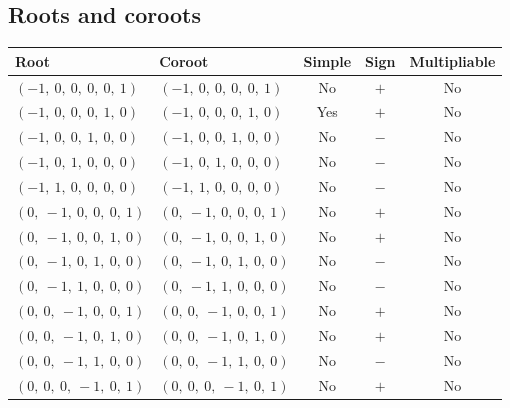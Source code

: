 \documentclass[11pt]{article}
\theoremstyle{definition}
\begin{document}
\subsection{Roots and coroots}
\begin{center}
\begin{tabular}{|l|l|c|c|c|}
    \hline
    \textbf{Root} & \textbf{Coroot} & \textbf{Simple} & \textbf{Sign} & \textbf{Multipliable} \\
    \hline
    $\left( -1, \  0, \  0, \  0, \  0, \  1\right)$ & $\left( -1, \  0, \  0, \  0, \  0, \  1\right)$ & No & $+$ & No \\
    \hline
    $\left( -1, \  0, \  0, \  0, \  1, \  0\right)$ & $\left( -1, \  0, \  0, \  0, \  1, \  0\right)$ & Yes & $+$ & No \\
    \hline
    $\left( -1, \  0, \  0, \  1, \  0, \  0\right)$ & $\left( -1, \  0, \  0, \  1, \  0, \  0\right)$ & No & $-$ & No \\
    \hline
    $\left( -1, \  0, \  1, \  0, \  0, \  0\right)$ & $\left( -1, \  0, \  1, \  0, \  0, \  0\right)$ & No & $-$ & No \\
    \hline
    $\left( -1, \  1, \  0, \  0, \  0, \  0\right)$ & $\left( -1, \  1, \  0, \  0, \  0, \  0\right)$ & No & $-$ & No \\
    \hline
    $\left( 0, \  -1, \  0, \  0, \  0, \  1\right)$ & $\left( 0, \  -1, \  0, \  0, \  0, \  1\right)$ & No & $+$ & No \\
    \hline
    $\left( 0, \  -1, \  0, \  0, \  1, \  0\right)$ & $\left( 0, \  -1, \  0, \  0, \  1, \  0\right)$ & No & $+$ & No \\
    \hline
    $\left( 0, \  -1, \  0, \  1, \  0, \  0\right)$ & $\left( 0, \  -1, \  0, \  1, \  0, \  0\right)$ & No & $-$ & No \\
    \hline
    $\left( 0, \  -1, \  1, \  0, \  0, \  0\right)$ & $\left( 0, \  -1, \  1, \  0, \  0, \  0\right)$ & No & $-$ & No \\
    \hline
    $\left( 0, \  0, \  -1, \  0, \  0, \  1\right)$ & $\left( 0, \  0, \  -1, \  0, \  0, \  1\right)$ & No & $+$ & No \\
    \hline
    $\left( 0, \  0, \  -1, \  0, \  1, \  0\right)$ & $\left( 0, \  0, \  -1, \  0, \  1, \  0\right)$ & No & $+$ & No \\
    \hline
    $\left( 0, \  0, \  -1, \  1, \  0, \  0\right)$ & $\left( 0, \  0, \  -1, \  1, \  0, \  0\right)$ & No & $-$ & No \\
    \hline
    $\left( 0, \  0, \  0, \  -1, \  0, \  1\right)$ & $\left( 0, \  0, \  0, \  -1, \  0, \  1\right)$ & No & $+$ & No \\

\end{tabular}
\end{center}
\end{document}

